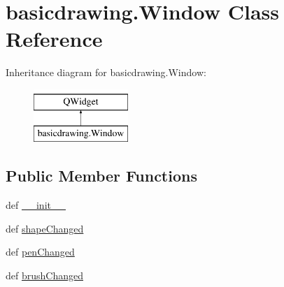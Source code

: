 \hypertarget{classbasicdrawing_1_1Window}{}\section{basicdrawing.\+Window Class Reference}
\label{classbasicdrawing_1_1Window}
Inheritance diagram for basicdrawing.\+Window\+:\begin{figure}[H]
\begin{center}
\leavevmode
\includegraphics[height=2.000000cm]{classbasicdrawing_1_1Window}
\end{center}
\end{figure}
\subsection*{Public Member Functions}
\begin{DoxyCompactItemize}
\item 
def \hyperlink{classbasicdrawing_1_1Window_a0ff444b0af931bc78574b5b5ce62fcf0}{\+\_\+\+\_\+init\+\_\+\+\_\+}
\item 
def \hyperlink{classbasicdrawing_1_1Window_a2cbbbd68428c412c913f1fbe50806a76}{shape\+Changed}
\item 
def \hyperlink{classbasicdrawing_1_1Window_a533d84153169e12398e4e9c3b22dd7fe}{pen\+Changed}
\item 
def \hyperlink{classbasicdrawing_1_1Window_a662687a08997d2af56233607f3a09811}{brush\+Changed}
\end{DoxyCompactItemize}
